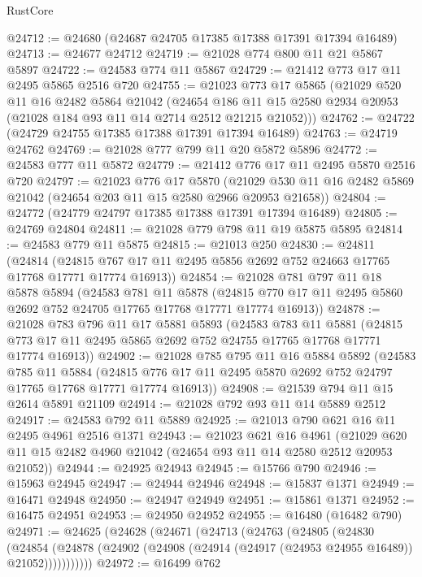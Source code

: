 \begin{lexlean}{RustCore}
\begin{coremodule}
@24712 := @24680 (@24687 @24705 @17385 @17388 @17391 @17394 @16489)
@24713 := @24677 @24712
@24719 := @21028 @774 @800 @11 @21 @5867 @5897
@24722 := @24583 @774 @11 @5867
@24729 := @21412 @773 @17 @11 @2495 @5865 @2516 @720
@24755 := @21023
    @773
    @17
    @5865
    (@21029
      @520
      @11
      @16
      @2482
      @5864
      @21042
      (@24654 @186 @11 @15 @2580 @2934 @20953 (@21028 @184 @93 @11 @14 @2714 @2512 @21215 @21052)))
@24762 := @24722 (@24729 @24755 @17385 @17388 @17391 @17394 @16489)
@24763 := @24719 @24762
@24769 := @21028 @777 @799 @11 @20 @5872 @5896
@24772 := @24583 @777 @11 @5872
@24779 := @21412 @776 @17 @11 @2495 @5870 @2516 @720
@24797 := @21023
    @776
    @17
    @5870
    (@21029 @530 @11 @16 @2482 @5869 @21042 (@24654 @203 @11 @15 @2580 @2966 @20953 @21658))
@24804 := @24772 (@24779 @24797 @17385 @17388 @17391 @17394 @16489)
@24805 := @24769 @24804
@24811 := @21028 @779 @798 @11 @19 @5875 @5895
@24814 := @24583 @779 @11 @5875
@24815 := @21013 @250
@24830 := @24811
    (@24814 (@24815 @767 @17 @11 @2495 @5856 @2692 @752 @24663 @17765 @17768 @17771 @17774 @16913))
@24854 := @21028
    @781
    @797
    @11
    @18
    @5878
    @5894
    (@24583
      @781
      @11
      @5878
      (@24815 @770 @17 @11 @2495 @5860 @2692 @752 @24705 @17765 @17768 @17771 @17774 @16913))
@24878 := @21028
    @783
    @796
    @11
    @17
    @5881
    @5893
    (@24583
      @783
      @11
      @5881
      (@24815 @773 @17 @11 @2495 @5865 @2692 @752 @24755 @17765 @17768 @17771 @17774 @16913))
@24902 := @21028
    @785
    @795
    @11
    @16
    @5884
    @5892
    (@24583
      @785
      @11
      @5884
      (@24815 @776 @17 @11 @2495 @5870 @2692 @752 @24797 @17765 @17768 @17771 @17774 @16913))
@24908 := @21539 @794 @11 @15 @2614 @5891 @21109
@24914 := @21028 @792 @93 @11 @14 @5889 @2512
@24917 := @24583 @792 @11 @5889
@24925 := @21013 @790 @621 @16 @11 @2495 @4961 @2516 @1371
@24943 := @21023
    @621
    @16
    @4961
    (@21029 @620 @11 @15 @2482 @4960 @21042 (@24654 @93 @11 @14 @2580 @2512 @20953 @21052))
@24944 := @24925 @24943
@24945 := @15766 @790
@24946 := @15963 @24945
@24947 := @24944 @24946
@24948 := @15837 @1371
@24949 := @16471 @24948
@24950 := @24947 @24949
@24951 := @15861 @1371
@24952 := @16475 @24951
@24953 := @24950 @24952
@24955 := @16480 (@16482 @790)
@24971 := @24625
    (@24628
      (@24671
        (@24713
          (@24763
            (@24805
              (@24830
                (@24854
                  (@24878 (@24902 (@24908 (@24914 (@24917 (@24953 @24955 @16489)) @21052)))))))))))
@24972 := @16499 @762

\end{coremodule}
\end{lexlean}
